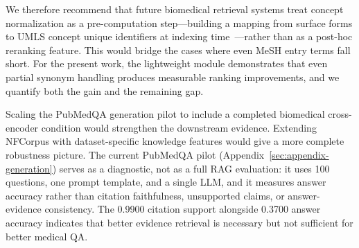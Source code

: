 We therefore recommend that future biomedical retrieval systems treat concept normalization as a pre-computation step---building a mapping from surface forms to UMLS concept unique identifiers at indexing time~\citep{bodenreider2004umls,leaman2013dnorm}---rather than as a post-hoc reranking feature. This would bridge the cases where even MeSH entry terms fall short. For the present work, the lightweight module demonstrates that even partial synonym handling produces measurable ranking improvements, and we quantify both the gain and the remaining gap.

Scaling the PubMedQA generation pilot to include a completed biomedical cross-encoder condition would strengthen the downstream evidence. Extending NFCorpus with dataset-specific knowledge features would give a more complete robustness picture. The current PubMedQA pilot (Appendix~\ref{sec:appendix-generation}) serves as a diagnostic, not as a full RAG evaluation: it uses 100 questions, one prompt template, and a single LLM, and it measures answer accuracy rather than citation faithfulness, unsupported claims, or answer-evidence consistency. The 0.9900 citation support alongside 0.3700 answer accuracy indicates that better evidence retrieval is necessary but not sufficient for better medical QA.

